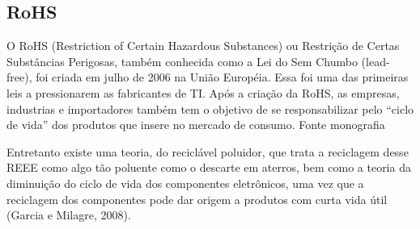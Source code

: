 
    

\subsection{RoHS}

O RoHS (Restriction of Certain Hazardous Substances) ou Restrição de Certas Substâncias Perigosas, também conhecida como a Lei do Sem Chumbo (lead-free), foi criada em julho de 2006 na União Européia. Essa foi uma das primeiras leis a pressionarem as fabricantes de TI. Após a criação da RoHS, as empresas, industrias e importadores também tem o objetivo de se responsabilizar pelo “ciclo de vida” dos produtos que insere no mercado de consumo. Fonte monografia

Entretanto existe uma teoria, do reciclável poluidor, que trata a reciclagem desse REEE como algo tão poluente como o descarte em aterros, bem como a teoria da diminuição do ciclo de vida dos componentes eletrônicos, uma vez que a reciclagem dos componentes pode dar origem a produtos com curta vida útil (Garcia e Milagre, 2008). 

